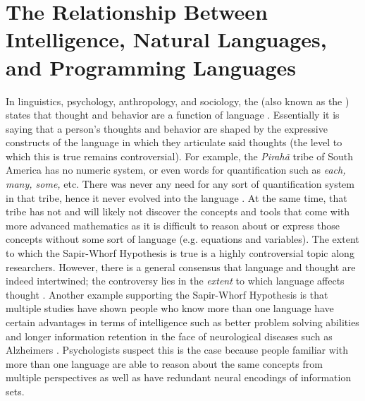 \section{The Relationship Between Intelligence, Natural Languages, and Programming Languages} 
In linguistics, psychology, anthropology, and sociology, the  (also known as the ) states that thought and behavior are a function of language \citep{kay:sapirwhorf}. Essentially it is saying that a person's thoughts and behavior are shaped by the expressive constructs of the language in which they articulate said thoughts (the level to which this is true remains controversial). For example, the \textit{Pirah\~{a}} tribe of South America has no numeric system, or even words for quantification such as \textit{each, many, some,} etc. There was never any need for any sort of quantification system in that tribe, hence it never evolved into the language  \citep{colapinto:piraha,vonbredow:livingwithoutnums}. At the same time, that tribe has not and will likely not discover the concepts and tools that come with more advanced mathematics as it is difficult to reason about or express those concepts without some sort of language (e.g. equations and variables). The extent to which the Sapir-Whorf Hypothesis is true is a highly controversial topic along researchers. However, there is a general consensus that language and thought are indeed intertwined; the controversy lies in the \textit{extent} to which language affects thought  \citep{carruthers:cogfunctionsoflanguage}. Another example supporting the Sapir-Whorf Hypothesis is that multiple studies have shown people who know more than one language have certain advantages in terms of intelligence such as better problem solving abilities and longer information retention in the face of neurological diseases such as Alzheimers \citep{bialystok-globallocal, bialystok-bilingualism, craik-alzheimerbilingual}. Psychologists suspect this is the case because people familiar with more than one language are able to reason about the same concepts from multiple perspectives as well as have redundant neural encodings of information sets.

